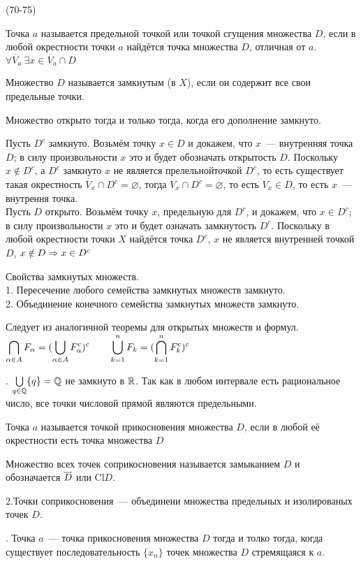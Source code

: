 (70-75)

\Op Точка $a$ называется предельной точкой  или точкой сгущения множества $D$, если в любой окрестности точки $a$ найдётся точка множества $D$, отличная от $a$.\\
$\forall \dot{V_a}\ \exists x \in \dot{V_a} \cap D$

\Op Множество $D$ называется замкнутым (в $X$), если он содержит все свои предельные точки.

\T Множество открыто тогда и только тогда, когда его дополнение замкнуто.

\D Пусть $D^c$ замкнуто. Возьмём точку $x \in D$ и докажем, что $x$~--- внутренняя точка $D$; в силу произвольности $x$ это и будет обозначать открытость $D$. Поскольку $x \notin D^c$, а $D^c$ замкнуто $x$ не является прелельнойточкой $D^c$, то есть существует такая окрестность $\dot{V_x} \cap D^c = \varnothing$, тогда $V_x \cap D^c = \varnothing$, то есть $V_x \in D$, то есть $x$~--- внутрення точка.\\
Пусть $D$ открыто. Возьмём точку $x$, предельную для $D^c$, и докажем, что $x\in D^c$; в силу произвольности $x$ это и будет означать замкнутость $D^c$. Поскольку в любой окрестности точки $X$ найдётся точка $D^c$, $x$ не является внутренней точкой $D$, $x \notin D \Rightarrow x \in D^c$

\T \q Свойства замкнутых множеств.\\
1. Пересечение любого семейства замкнутых множеств замкнуто.\\
2. Объединение конечного семейства замкнутых множеств замкнуто.

\D Следует из аналогичной теоремы для открытых множеств и формул.\\
$\displaystyle\bigcap\limits_{\alpha \in A} F_\alpha = (\bigcup\limits_{\alpha \in A} F^c_\alpha)^c \qquad \bigcup\limits^n_{k = 1} F_k = (\bigcap^n_{k = 1}F^c_k)^c$

. $\bigcup\limits_{q \in \mathbb{Q}} \{q\} = \mathbb{Q}$ не замкнуто в $\mathbb{R}$. Так как в любом интервале есть рациональное число, все точки числовой прямой являются предельными.

\Op Точка $a$ называется точкой прикосновения множества $D$, если в любой её окрестности есть точка множества $D$

\Op Множество всех точек соприкосновения называется замыканием $D$ и обозначается $\overline{D}$ или Cl$D$.

\Zam2.Точки соприкосновения~--- объединени множества предельных и изолированых точек $D$.

. Точка $a$~--- точка прикосновения множества $D$ тогда и толко тогда, когда существует последовательность $\{x_n\}$ точек множества $D$ стремящаяся к $a$.

